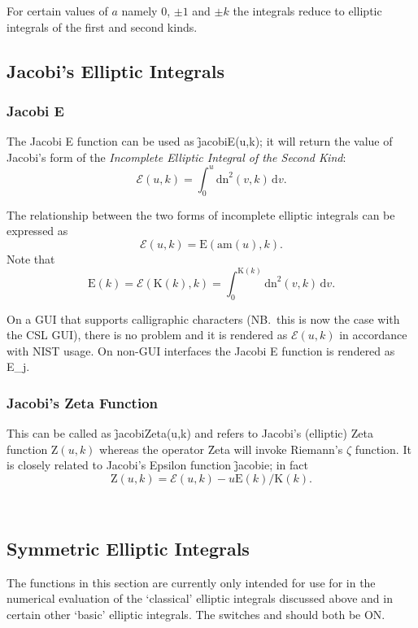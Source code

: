 For certain values of $a$ namely $0$, $\pm 1$ and $\pm k$ the integrals reduce
to elliptic integrals of the first and second kinds.

\subsection{Jacobi's Elliptic Integrals}
\subsubsection{Jacobi E}
\hypertarget{operator:JACOBIE}{}
The Jacobi E function can be used as  \f{jacobiE(u,k)};
it will return the value of Jacobi's form of
the \emph{Incomplete Elliptic Integral of the Second Kind}:
\[\mathcal{E}(u, k)=\int_0^u \mathrm{dn}^2 (v, k) \,\mathrm{d}v.\]

The relationship between the two forms of incomplete elliptic integrals can
be expressed as
\[\mathcal{E}(u, k) = \mathrm{E}(\mathrm{am}(u), k).\]
Note that
\[\mathrm{E}(k)=\mathcal{E}(\mathrm{K}(k), k)
=\int_0^{\mathrm{K}(k)} \mathrm{dn}^2(v, k) \,\mathrm{d}v.\]

On a GUI that supports calligraphic characters (NB.\ this is now the case with the
CSL GUI), there is no problem and it is rendered as $\mathcal{E}(u,k)$
in accordance with NIST usage.
On non-GUI interfaces the Jacobi E function is rendered as E\_j.

\subsubsection{Jacobi's Zeta Function}
\hypertarget{operator:JACOBIZETA}{}

This can be called as \f{jacobiZeta(u,k)} and refers to Jacobi's (elliptic)
Zeta function $\mathrm{Z}(u,k)$ whereas the operator \f{Zeta} will invoke
Riemann's $\zeta$ function. It is closely related to Jacobi's Epsilon function
\f{jacobie}; in fact
\[\mathrm{Z}(u,k) = \mathcal{E}(u,k)-u\mathrm{E}(k)/\mathrm{K}(k).\]

\
\subsection{Symmetric Elliptic Integrals}
The functions in this section are currently only intended for use for in the
numerical evaluation of the `classical' elliptic integrals discussed above and
in certain other `basic' elliptic integrals. The switches \sw{ROUNDED} and
\sw{COMPLEX} should both be ON.

